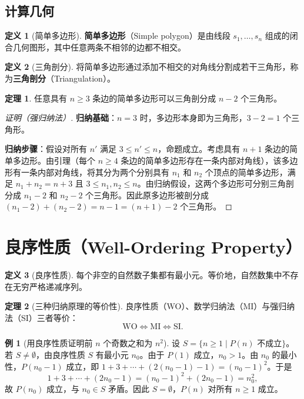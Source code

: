 \documentclass[UTF8,11pt,a4paper]{ctexbook}   %
\theoremstyle{definition}
\newtheorem{definition}{定义}[section]
\newtheorem{theorem}{定理}[section]
\newtheorem{example}{例}[section]
\begin{document}
\subsection{计算几何}

\begin{definition}[简单多边形]
\textbf{简单多边形}（Simple polygon）是由线段 $s_1,\dots,s_n$ 组成的闭合几何图形，其中任意两条不相邻的边都不相交。
\end{definition}

\begin{definition}[三角剖分]
将简单多边形通过添加不相交的对角线分割成若干三角形，称为\textbf{三角剖分}（Triangulation）。
\end{definition}

\begin{theorem}
任意具有 $n \geq 3$ 条边的简单多边形可以三角剖分成 $n-2$ 个三角形。
\end{theorem}

\begin{proof}[证明（强归纳法）]
\textbf{归纳基础}：$n=3$ 时，多边形本身即为三角形，$3-2=1$ 个三角形。

\textbf{归纳步骤}：假设对所有 $n'$ 满足 $3 \leq n' \leq n$，命题成立。考虑具有 $n+1$ 条边的简单多边形。由引理（每个 $n \geq 4$ 条边的简单多边形存在一条内部对角线），该多边形有一条内部对角线，将其分为两个分别具有 $n_1$ 和 $n_2$ 个顶点的简单多边形，满足 $n_1+n_2=n+3$ 且 $3 \leq n_1,n_2 \leq n$。由归纳假设，这两个多边形可分别三角剖分成 $n_1-2$ 和 $n_2-2$ 个三角形。因此原多边形被剖分成 $(n_1-2)+(n_2-2) = n-1 = (n+1)-2$ 个三角形。
\end{proof}

\section{良序性质（Well-Ordering Property）}

\begin{definition}[良序性质]
每个非空的自然数子集都有最小元。等价地，自然数集中不存在无穷严格递减序列。
\end{definition}

\begin{theorem}[三种归纳原理的等价性]
良序性质（WO）、数学归纳法（MI）与强归纳法（SI）三者等价：
\[
\text{WO} \iff \text{MI} \iff \text{SI}.
\]
\end{theorem}

\begin{example}[用良序性质证明前 $n$ 个奇数之和为 $n^2$]
设 $S = \{n \geq 1 \mid P(n) \text{ 不成立}\}$。若 $S \neq \emptyset$，由良序性质 $S$ 有最小元 $n_0$。由于 $P(1)$ 成立，$n_0 > 1$。由 $n_0$ 的最小性，$P(n_0-1)$ 成立，即 $1+3+\cdots+(2(n_0-1)-1) = (n_0-1)^2$。于是
\[
1+3+\cdots+(2n_0-1) = (n_0-1)^2 + (2n_0-1) = n_0^2,
\]
故 $P(n_0)$ 成立，与 $n_0 \in S$ 矛盾。因此 $S = \emptyset$，$P(n)$ 对所有 $n \geq 1$ 成立。
\end{example}
\end{document}
